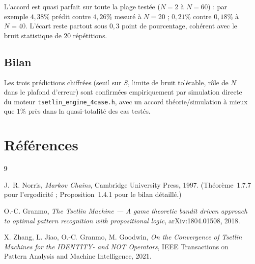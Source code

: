 \documentclass[12pt,a4paper]{article}
\theoremstyle{remark}
\begin{document}
L'accord est quasi parfait sur toute la plage testée ($N=2$ à $N=60$) : par exemple
$4{,}38\%$ prédit contre $4{,}26\%$ mesuré à $N=20$ ; $0{,}21\%$ contre $0{,}18\%$ à
$N=40$. L'écart reste partout sous $0{,}3$ point de pourcentage, cohérent avec le
bruit statistique de $20$ répétitions.

\subsection{Bilan}

Les trois prédictions chiffrées (seuil sur $S$, limite de bruit tolérable, rôle de
$N$ dans le plafond d'erreur) sont confirmées empiriquement par simulation directe du
moteur \texttt{tsetlin\_engine\_4case.h}, avec un accord théorie/simulation à mieux que
$1\%$ près dans la quasi-totalité des cas testés.

\section*{Références}

\begin{thebibliography}{9}

J.~R. Norris,
\textit{Markov Chains},
Cambridge University Press, 1997.
(Théorème~1.7.7 pour l'ergodicité ; Proposition~1.4.1 pour le bilan détaillé.)

O.-C. Granmo,
\textit{The Tsetlin Machine --- A game theoretic bandit driven approach to
optimal pattern recognition with propositional logic},
arXiv:1804.01508, 2018.

X. Zhang, L. Jiao, O.-C. Granmo, M. Goodwin,
\textit{On the Convergence of Tsetlin Machines for the IDENTITY- and NOT Operators},
IEEE Transactions on Pattern Analysis and Machine Intelligence, 2021.

\end{thebibliography}
\end{document}
